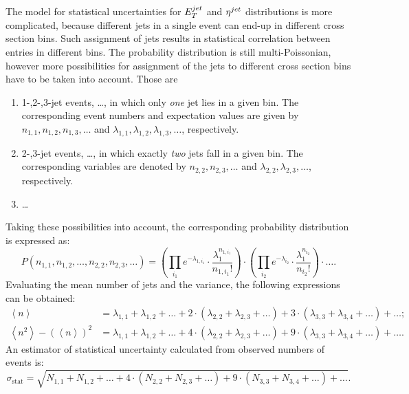 The model for statistical uncertainties for $\mbox{$E_T^{jet}$}$ and $\mbox{$\eta^{jet}$}$ distributions is more complicated, because different jets in a single event can end-up in different cross section bins. Such assignment of jets results in statistical correlation between entries in different bins. The probability distribution is still multi-Poissonian, however more possibilities for assignment of the jets to different cross section bins have to be taken into account. Those are
 \begin{enumerate}
  \item 1-,2-,3-jet events, \ldots, in which only \textit{one} jet lies in a given bin. The corresponding event numbers and expectation values are given by $n_{1,1}, n_{1,2}, n_{1,3}, \ldots$ and $\lambda_{1,1}, \lambda_{1,2}, \lambda_{1,3}, \ldots$, respectively.
  \item 2-,3-jet events, \ldots, in which exactly \textit{two} jets fall in a given bin. The corresponding variables are denoted by $n_{2,2}, n_{2,3}, \ldots$ and $\lambda_{2,2}, \lambda_{2,3}, \ldots$, respectively.
  \item \ldots
 \end{enumerate}
Taking these possibilities into account, the corresponding probability distribution is expressed as:
\begin{equation}
P\left(n_{1,1}, n_{1,2},\ldots, n_{2,2}, n_{2,3}, \ldots \right) = \left( \prod_{i_1}{ e^{-\lambda_{1,i_1}} \cdot \frac{\lambda_1^{n_{1,{i_1}}}}{n_{1,{i_1}}!} } \right) \cdot \left( \prod_{i_2}{ e^{-\lambda_{i_2} } \cdot \frac{\lambda_1^{n_{i_2}}}{n_{i_2}!} } \right) \cdot \ldots.
\label{eq:multipoissonqsq}
\end{equation}
Evaluating the mean number of jets and the variance, the following expressions can be obtained:
\begin{align}
 \left\langle n \right\rangle &= \lambda_{1,1} + \lambda_{1,2} + \ldots + 2\cdot\left(\lambda_{2,2}+\lambda_{2,3}+\ldots\right) + 3\cdot\left( \lambda_{3,3} + \lambda_{3,4} + \ldots \right) + \ldots;\\
 \left\langle n^2 \right \rangle - \left( \left\langle n \right \rangle \right)^2 &= \lambda_{1,1} + \lambda_{1,2} + \ldots + 4\cdot\left(\lambda_{2,2}+\lambda_{2,3}+\ldots\right) + 9\cdot\left( \lambda_{3,3} + \lambda_{3,4} + \ldots \right) + \ldots. 
\end{align} 
An estimator of statistical uncertainty calculated from observed numbers of events is:
\begin{equation}
 \sigma_\text{stat} = \sqrt{ N_{1,1} + N_{1,2} + \ldots + 4\cdot\left(N_{2,2}+N_{2,3}+\ldots\right) + 9\cdot\left( N_{3,3} + N_{3,4} + \ldots \right) + \ldots}.
\end{equation}

